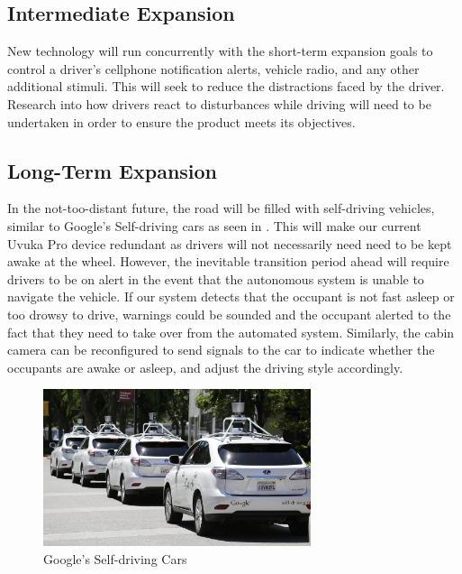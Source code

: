 \subsection{Intermediate Expansion}
New technology will run concurrently with the short-term expansion goals to control a driver's cellphone notification alerts, vehicle radio, and any other additional stimuli. This will seek to reduce the distractions faced by the driver. Research into how drivers react to disturbances while driving will need to be undertaken in order to ensure the product meets its objectives.

\subsection{Long-Term Expansion}
In the not-too-distant future, the road will be filled with self-driving vehicles, similar to Google's Self-driving cars as seen in . This will make our current Uvuka Pro device redundant as drivers will not necessarily need need to be kept awake at the wheel. However, the inevitable transition period ahead will require drivers to be on alert in the event that the autonomous system is unable to navigate the vehicle. If our system detects that the occupant is not fast asleep or too drowsy to drive, warnings could be sounded and the occupant alerted to the fact that they need to take over from the automated system. Similarly, the cabin camera can be reconfigured to send signals to the car to indicate whether the occupants are awake or asleep, and adjust the driving style accordingly.

\begin{figure}[H]
\centering
\includegraphics[width=0.7\textwidth]{images/Google_Cars}
\vskip10pt
\caption[Google's Self-driving Cars]{Google's Self-driving Cars \cite{googlecars}}
\label{fig:gcars}
\end{figure}



\newpage
\renewcommand\bibname{References}



